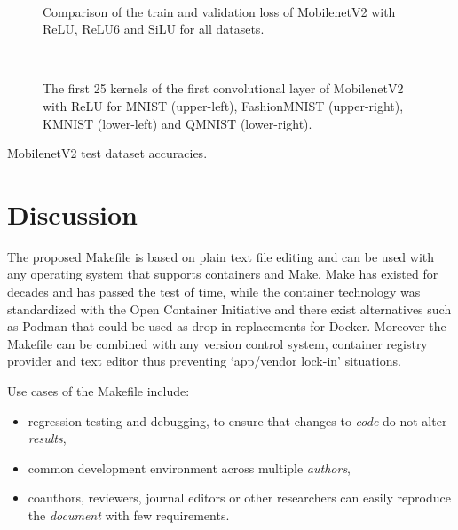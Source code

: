 \documentclass[journal]{IEEEtran}
\begin{document}
\begin{figure}[!t]
	\\
	\caption{Comparison of the train and validation loss of MobilenetV2 with ReLU, ReLU6 and SiLU for all datasets.}\label{fig:loss}
\end{figure}

\begin{figure}[!t]
	\\
	\caption{The first 25 kernels of the first convolutional layer of MobilenetV2 with ReLU for MNIST (upper-left), FashionMNIST (upper-right), KMNIST (lower-left) and QMNIST (lower-right).}\label{fig:kernels}
\end{figure}

\begin{table}[ht]
	\centering
	\caption{MobilenetV2 test dataset accuracies.}\label{table:table}
	\setlength\tabcolsep{4pt}
	
\end{table}

\section{Discussion}
The proposed Makefile is based on plain text file editing and can be used with any operating system that supports containers and Make.
Make has existed for decades and has passed the test of time, while the container technology was standardized with the Open Container Initiative and there exist alternatives such as Podman that could be used as drop-in replacements for Docker.
Moreover the Makefile can be combined with any version control system, container registry provider and text editor thus preventing `app/vendor lock-in' situations.

Use cases of the Makefile include:
\begin{itemize}
	\item regression testing and debugging, to ensure that changes to \textit{code} do not alter \textit{results},
	\item common development environment across multiple \textit{authors},
	\item coauthors, reviewers, journal editors or other researchers can easily reproduce the \textit{document} with few requirements.
\end{itemize}
\end{document}
